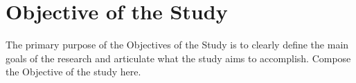 \section{Objective of the Study}

The primary purpose of the Objectives of the Study is to clearly define the main goals of the research and articulate what the study aims to accomplish. Compose the Objective of the study here.